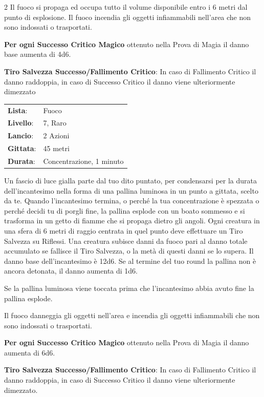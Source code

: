 \begin{multicols}{2}
Il fuoco si propaga ed occupa tutto il volume disponibile entro i 6 metri dal punto di esplosione. Il fuoco incendia gli oggetti infiammabili nell'area che non sono indossati o trasportati.

\textbf{Per ogni Successo Critico Magico} ottenuto nella Prova di Magia il danno base aumenta di 4d6.

\textbf{Tiro Salvezza Successo/Fallimento Critico}: In caso di Fallimento Critico il danno raddoppia, in caso di Successo Critico il danno viene ulteriormente dimezzato

\noindent\begin{tabularx}{\linewidth}{p{1.9cm}X}
	\rowcolor{gray!20}\textbf{Lista}: & Fuoco \\
	\textbf{Livello}: & 7, Raro \\
	\rowcolor{gray!20}\textbf{Lancio}: & 2 Azioni \\
	\textbf{Gittata}: & 45 metri \\
	\rowcolor{gray!20}\textbf{Durata}: & Concentrazione, 1 minuto \\
\end{tabularx}\smallskip

Un fascio di luce gialla parte dal tuo dito puntato, per condensarsi per la durata dell'incantesimo nella forma di una pallina luminosa in un punto a gittata, scelto da te. Quando l'incantesimo termina, o perché la tua concentrazione è spezzata o perché decidi tu di porgli fine, la pallina esplode con un boato sommesso e si trasforma in un getto di fiamme che si propaga dietro gli angoli. Ogni creatura in una sfera di 6 metri di raggio centrata in quel punto deve effettuare un Tiro Salvezza su Riflessi. Una creatura subisce danni da fuoco pari al danno totale accumulato se fallisce il Tiro Salvezza, o la metà di questi danni se lo supera. Il danno base dell'incantesimo è 12d6. Se al termine del tuo round la pallina non è ancora detonata, il danno aumenta di 1d6.

Se la pallina luminosa viene toccata prima che l'incantesimo abbia avuto fine la pallina esplode.

Il fuoco danneggia gli oggetti nell'area e incendia gli oggetti infiammabili che non sono indossati o trasportati.

\textbf{Per ogni Successo Critico Magico} ottenuto nella Prova di Magia il danno aumenta di 6d6.

\textbf{Tiro Salvezza Successo/Fallimento Critico}: In caso di Fallimento Critico il danno raddoppia, in caso di Successo Critico il danno viene ulteriormente dimezzato.


\end{multicols}

